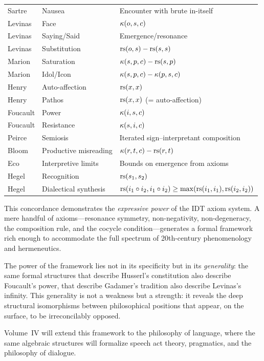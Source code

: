 \begin{remark}
\begin{center}
\begin{tabular}{lll}
Sartre & Nausea & Encounter with brute in-itself \\
Levinas & Face & $\kappa(o, s, c)$ \\
Levinas & Saying/Said & Emergence/resonance \\
Levinas & Substitution & $\mathrm{rs}(o, s) - \mathrm{rs}(s, s)$ \\
Marion & Saturation & $\kappa(s, p, c) - \mathrm{rs}(s, p)$ \\
Marion & Idol/Icon & $\kappa(s, p, c) - \kappa(p, s, c)$ \\
Henry & Auto-affection & $\mathrm{rs}(x, x)$ \\
Henry & Pathos & $\mathrm{rs}(x, x)$ (= auto-affection) \\
Foucault & Power & $\kappa(i, s, c)$ \\
Foucault & Resistance & $\kappa(s, i, c)$ \\
Peirce & Semiosis & Iterated sign--interpretant composition \\
Bloom & Productive misreading & $\kappa(r, t, c) - \mathrm{rs}(r, t)$ \\
Eco & Interpretive limits & Bounds on emergence from axioms \\
Hegel & Recognition & $\mathrm{rs}(s_1, s_2)$ \\
Hegel & Dialectical synthesis & $\mathrm{rs}(i_1 \circ i_2, i_1 \circ i_2) \geq \max(\mathrm{rs}(i_1,i_1), \mathrm{rs}(i_2,i_2))$ \\
\end{tabular}
\end{center}

This concordance demonstrates the \emph{expressive power} of the IDT axiom
system.  A mere handful of axioms---resonance symmetry, non-negativity,
non-degeneracy, the composition rule, and the cocycle condition---generates
a formal framework rich enough to accommodate the full spectrum of
20th-century phenomenology and hermeneutics.

The power of the framework lies not in its specificity but in its
\emph{generality}: the same formal structures that describe Husserl's
constitution also describe Foucault's power, that describe Gadamer's tradition
also describe Levinas's infinity.  This generality is not a weakness but a
strength: it reveals the deep structural isomorphisms between philosophical
positions that appear, on the surface, to be irreconcilably opposed.

Volume~IV will extend this framework to the philosophy of language, where the
same algebraic structures will formalize speech act theory, pragmatics, and
the philosophy of dialogue.
\end{remark}

